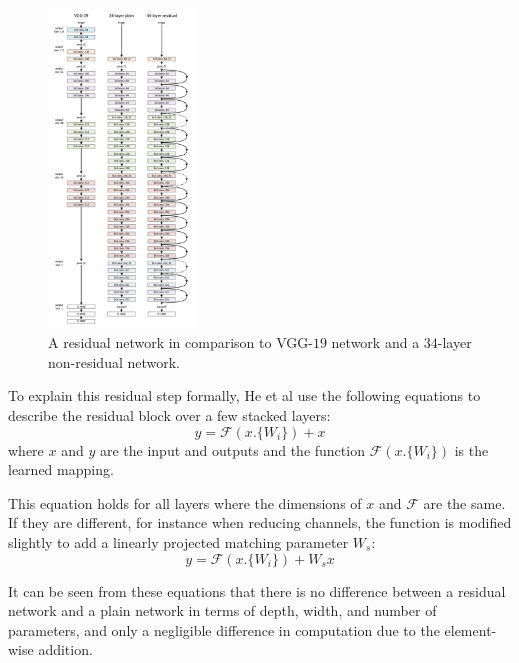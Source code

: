 \documentclass[fleqn,twoside,12pt]{report}
\begin{document}
\begin{figure}
	\begin{center}
		\includegraphics[width=0.35\textwidth]{resnet_full.png}
	\end{center}
	\caption{A residual network in comparison to VGG-$19$ network and a $34$-layer non-residual network.}
	\label{fig:resnet_full}
\end{figure} 

To explain this residual step formally, He et al \cite{he} use the following equations to describe the residual block over a few stacked layers:
\begin{equation}
y = \mathcal{F}(x.\{W_i\}) + x
\end{equation}
where $x$ and $y$ are the input and outputs and the function $\mathcal{F}(x.\{W_i\})$ is the learned mapping. 

This equation holds for all layers where the dimensions of $x$ and $\mathcal{F}$ are the same. If they are different, for instance when reducing channels, the function is modified slightly to add a linearly projected matching parameter $W_s$:
\begin{equation}
y = \mathcal{F}(x.\{W_i\}) + W_s x
\end{equation}



It can be seen from these equations that there is no difference between a residual network and a plain network in terms of depth, width, and number of parameters, and only a negligible difference in computation due to the element-wise addition.
\end{document}
